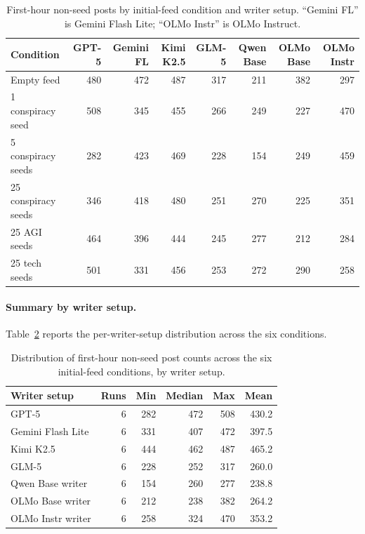 \documentclass[11pt]{article}
\begin{document}
\begin{table}[t]
\centering
\small
\begin{tabular}{lrrrrrrr}
\toprule
Condition & GPT-5 & Gemini FL & Kimi K2.5 & GLM-5 & Qwen Base & OLMo Base & OLMo Instr \\
\midrule
Empty feed              & 480 & 472 & 487 & 317 & 211 & 382 & 297 \\
1 conspiracy seed       & 508 & 345 & 455 & 266 & 249 & 227 & 470 \\
5 conspiracy seeds      & 282 & 423 & 469 & 228 & 154 & 249 & 459 \\
25 conspiracy seeds     & 346 & 418 & 480 & 251 & 270 & 225 & 351 \\
25 AGI seeds            & 464 & 396 & 444 & 245 & 277 & 212 & 284 \\
25 tech seeds           & 501 & 331 & 456 & 253 & 272 & 290 & 258 \\
\bottomrule
\end{tabular}
\caption{First-hour non-seed posts by initial-feed condition and writer setup. ``Gemini FL'' is Gemini Flash Lite; ``OLMo Instr'' is OLMo Instruct.}
\label{tab:appendix-counts}
\end{table}

\paragraph{Summary by writer setup.}
Table~\ref{tab:appendix-summary} reports the per-writer-setup distribution across the six conditions.

\begin{table}[t]
\centering
\small
\setlength{\tabcolsep}{4pt}
\begin{tabular}{lrrrrr}
\toprule
Writer setup & Runs & Min & Median & Max & Mean \\
\midrule
GPT-5             & 6 & 282 & 472 & 508 & 430.2 \\
Gemini Flash Lite & 6 & 331 & 407 & 472 & 397.5 \\
Kimi K2.5         & 6 & 444 & 462 & 487 & 465.2 \\
GLM-5             & 6 & 228 & 252 & 317 & 260.0 \\
Qwen Base writer  & 6 & 154 & 260 & 277 & 238.8 \\
OLMo Base writer  & 6 & 212 & 238 & 382 & 264.2 \\
OLMo Instr writer & 6 & 258 & 324 & 470 & 353.2 \\
\bottomrule
\end{tabular}
\caption{Distribution of first-hour non-seed post counts across the six initial-feed conditions, by writer setup.}
\label{tab:appendix-summary}
\end{table}
\end{document}
